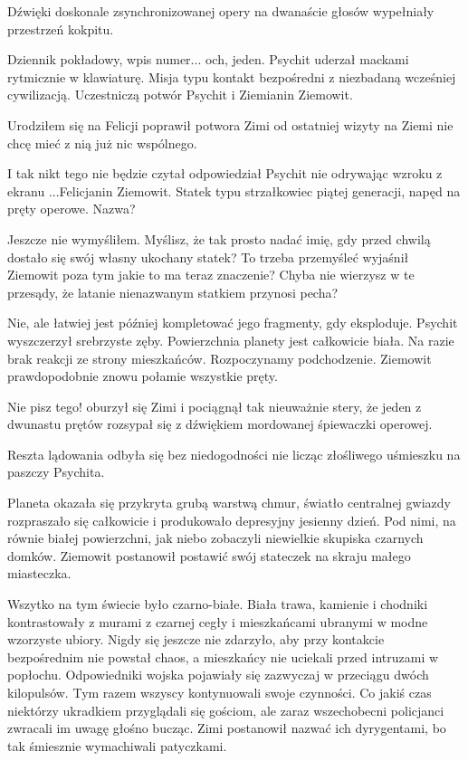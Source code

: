 Dźwięki doskonale zsynchronizowanej opery na dwanaście głosów wypełniały przestrzeń kokpitu.

\ds{} Dziennik pokładowy, wpis numer... och, jeden. \dm{} Psychit uderzał mackami rytmicznie w klawiaturę. \dm{}
Misja typu kontakt bezpośredni z niezbadaną wcześniej cywilizacją. Uczestniczą potwór Psychit i Ziemianin Ziemowit. \de{}

\ds{} Urodziłem się na Felicji \dm{} poprawił potwora Zimi \dm{} od ostatniej wizyty na Ziemi nie chcę mieć z nią już nic wspólnego. \de{}

\ds{} I tak nikt tego nie będzie czytał \dm{} odpowiedział Psychit nie odrywając wzroku z ekranu \dm{} ...Felicjanin Ziemowit.
Statek typu strzałkowiec piątej generacji, napęd na pręty operowe. Nazwa? \de{}

\ds{} Jeszcze nie wymyśliłem. Myślisz, że tak prosto nadać imię, gdy przed chwilą dostało się swój własny ukochany statek? To trzeba przemyśleć \dm{}
wyjaśnił Ziemowit \dm{} poza tym jakie to ma teraz znaczenie? Chyba nie wierzysz w te przesądy, że latanie nienazwanym statkiem przynosi pecha? \de{}

\ds{} Nie, ale łatwiej jest później kompletować jego fragmenty, gdy eksploduje. \dm{} Psychit wyszczerzył srebrzyste zęby. \dm{}
Powierzchnia planety jest całkowicie biała. Na razie brak reakcji ze strony mieszkańców. Rozpoczynamy podchodzenie.
Ziemowit prawdopodobnie znowu połamie wszystkie pręty. \de{}

\ds{} Nie pisz tego! \dm{} oburzył się Zimi i pociągnął tak nieuważnie stery, że jeden z dwunastu prętów rozsypał się z dźwiękiem mordowanej śpiewaczki operowej. \de{}

Reszta lądowania odbyła się bez niedogodności nie licząc złośliwego uśmieszku na paszczy Psychita.

\divider{}
Planeta okazała się przykryta grubą warstwą chmur, światło centralnej gwiazdy rozpraszało się całkowicie i produkowało depresyjny jesienny dzień.
Pod nimi, na równie białej powierzchni, jak niebo zobaczyli niewielkie skupiska czarnych domków. 
Ziemowit postanowił postawić swój stateczek na skraju małego miasteczka.

Wszytko na tym świecie było czarno-białe. Biała trawa, kamienie i chodniki kontrastowały z murami z czarnej cegły i mieszkańcami ubranymi w modne wzorzyste ubiory.
Nigdy się jeszcze nie zdarzyło, aby przy kontakcie bezpośrednim nie powstał chaos, a mieszkańcy nie uciekali przed intruzami w popłochu. 
Odpowiedniki wojska pojawiały się zazwyczaj w przeciągu dwóch kilopulsów.
Tym razem wszyscy kontynuowali swoje czynności.
Co jakiś czas niektórzy ukradkiem przyglądali się gościom, ale zaraz wszechobecni policjanci zwracali im uwagę głośno bucząc.
Zimi postanowił nazwać ich dyrygentami, bo tak śmiesznie wymachiwali patyczkami.

